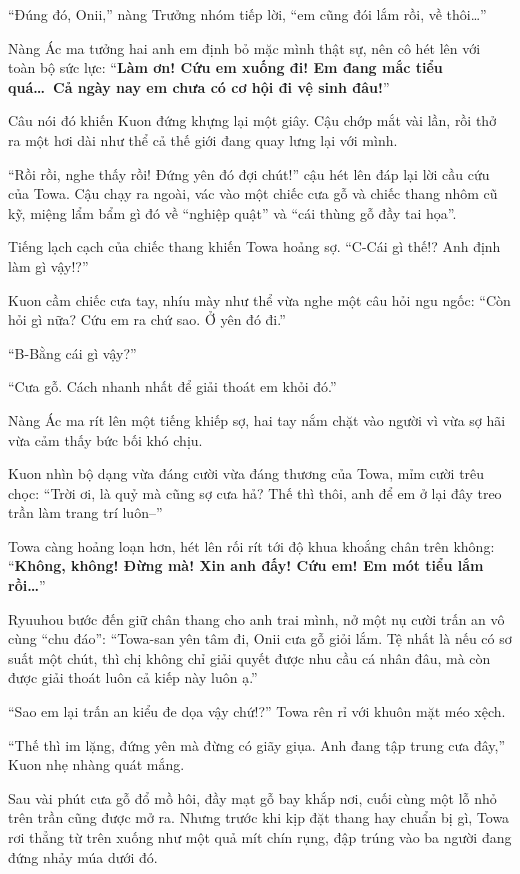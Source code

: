 \documentclass[../main.tex]{subfiles}
\begin{document}
``Đúng đó, Onii,'' nàng Trưởng nhóm tiếp lời, ``em cũng đói lắm rồi, về thôi\dots''

Nàng Ác ma tưởng hai anh em định bỏ mặc mình thật sự, nên cô hét lên với toàn bộ sức lực: ``\textbf{Làm ơn! Cứu em xuống đi! Em đang mắc tiểu quá\dots\ Cả ngày nay em chưa có cơ hội đi vệ sinh đâu!}''

Câu nói đó khiến Kuon đứng khựng lại một giây. Cậu chớp mắt vài lần, rồi thở ra một hơi dài như thể cả thế giới đang quay lưng lại với mình.

``Rồi rồi, nghe thấy rồi! Đứng yên đó đợi chút!'' cậu hét lên đáp lại lời cầu cứu của Towa. Cậu chạy ra ngoài, vác vào một chiếc cưa gỗ và chiếc thang nhôm cũ kỹ, miệng lẩm bẩm gì đó về ``nghiệp quật'' và ``cái thùng gỗ đầy tai họa''.

Tiếng lạch cạch của chiếc thang khiến Towa hoảng sợ. ``C-Cái gì thế!? Anh định làm gì vậy!?''

Kuon cầm chiếc cưa tay, nhíu mày như thể vừa nghe một câu hỏi ngu ngốc: ``Còn hỏi gì nữa? Cứu em ra chứ sao. Ở yên đó đi.''

``B-Bằng cái gì vậy?''

``Cưa gỗ. Cách nhanh nhất để giải thoát em khỏi đó.''

Nàng Ác ma rít lên một tiếng khiếp sợ, hai tay nắm chặt vào người vì vừa sợ hãi vừa cảm thấy bức bối khó chịu.

Kuon nhìn bộ dạng vừa đáng cười vừa đáng thương của Towa, mỉm cười trêu chọc: ``Trời ơi, là quỷ mà cũng sợ cưa hả? Thế thì thôi, anh để em ở lại đây treo trần làm trang trí luôn--''

Towa càng hoảng loạn hơn, hét lên rối rít tới độ khua khoắng chân trên không: ``\textbf{Không, không! Đừng mà! Xin anh đấy! Cứu em! Em mót tiểu lắm rồi\dots}''

Ryuuhou bước đến giữ chân thang cho anh trai mình, nở một nụ cười trấn an vô cùng ``chu đáo'': ``Towa-san yên tâm đi, Onii cưa gỗ giỏi lắm. Tệ nhất là nếu có sơ suất một chút, thì chị không chỉ giải quyết được nhu cầu cá nhân đâu, mà còn được giải thoát luôn cả kiếp này luôn ạ.''

``Sao em lại trấn an kiểu đe dọa vậy chứ!?'' Towa rên rỉ với khuôn mặt méo xệch.

``Thế thì im lặng, đứng yên mà đừng có giãy giụa. Anh đang tập trung cưa đây,'' Kuon nhẹ nhàng quát mắng.

Sau vài phút cưa gỗ đổ mồ hôi, đầy mạt gỗ bay khắp nơi, cuối cùng một lỗ nhỏ trên trần cũng được mở ra. Nhưng trước khi kịp đặt thang hay chuẩn bị gì, Towa rơi thẳng từ trên xuống như một quả mít chín rụng, đập trúng vào ba người đang đứng nhảy múa dưới đó.
\end{document}
